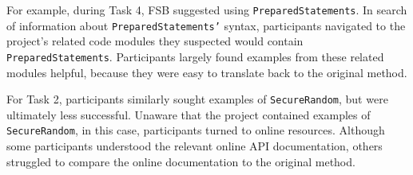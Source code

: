 \documentclass[10pt,journal,compsoc]{IEEEtran}
\begin{document}
For example, during Task 4, FSB suggested using \texttt{PreparedStatements}. 
In search of information about \texttt{PreparedStatements'} syntax, participants navigated to the project's related code modules they suspected would contain \texttt{PreparedStatements}.
Participants largely found examples from these related modules helpful, because they were easy to translate back to the original method.

For Task 2, participants similarly sought examples of \texttt{SecureRandom}, but were ultimately less successful.
Unaware that the project contained examples of \texttt{SecureRandom}, in this case, participants turned to online resources.
Although some participants understood the relevant online API documentation, others struggled to compare the online documentation to the original method.





\end{document}
